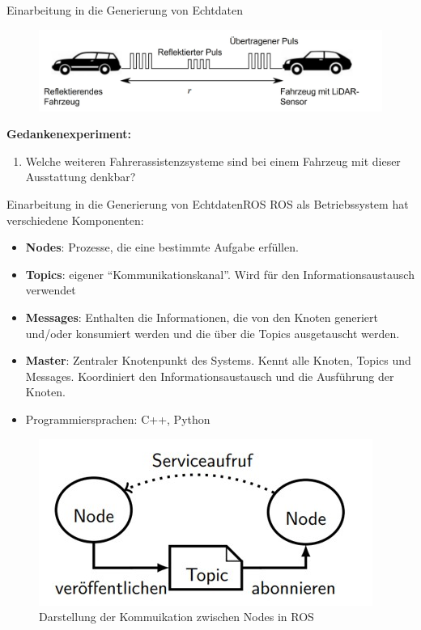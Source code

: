 \documentclass[169, handout	]{THIbeamer} %
\begin{document}
\begin{frame}{Einarbeitung in die Generierung von Echtdaten}
	\begin{figure}
		\includegraphics[scale=0.4]{"required/Szenariobeschreibung_auto.jpg"}
	\end{figure}	
	\textbf{Gedankenexperiment:}\\
	\begin{enumerate}
		\item Welche weiteren Fahrerassistenzsysteme sind bei einem Fahrzeug mit dieser Ausstattung denkbar? 
	\end{enumerate}
\end{frame}
	\begin{frame}{Einarbeitung in die Generierung von Echtdaten}{ROS}			
		\footnotesize
		ROS als Betriebssystem hat verschiedene Komponenten:
		\begin{itemize}
			\item \textbf{Nodes}: Prozesse, die eine bestimmte Aufgabe erfüllen.
			\item \textbf{Topics}: eigener \enquote{Kommunikationskanal}. Wird für den Informationsaustausch verwendet
			\item \textbf{Messages}: Enthalten die Informationen, die von den Knoten generiert und/oder konsumiert werden und die über die Topics ausgetauscht werden.
			\item \textbf{Master}: Zentraler Knotenpunkt des Systems. Kennt alle Knoten, Topics und Messages. Koordiniert den Informationsaustausch und die Ausführung der Knoten.
			\item Programmiersprachen: C++, Python 
		\end{itemize}				
		\begin{figure}
			\includegraphics[scale=0.35]{required/ROS-Aufbau.jpg}
			\caption{Darstellung der Kommuikation zwischen Nodes in ROS}
		\end{figure}
	\end{frame}
\end{document}
